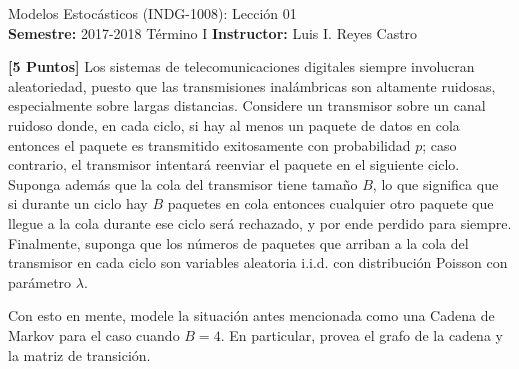 \documentclass[ a4paper, twoside, 11pt]{article}
\newcommand{\numero}{01}
\begin{document}
\allowdisplaybreaks

\begin{center}
\Large Modelos Estoc\'asticos (INDG-1008): Lecci\'on \numero \\[1ex]
\small \textbf{Semestre:} 2017-2018 T\'ermino I \qquad
\textbf{Instructor:} Luis I. Reyes Castro
\end{center}
\halfskip



\begin{problem}
\textbf{[5 Puntos]} Los sistemas de telecomunicaciones digitales siempre involucran aleatoriedad, puesto que las transmisiones inal\'ambricas son altamente ruidosas, especialmente sobre largas distancias. Considere un transmisor sobre un canal ruidoso donde, en cada ciclo, \linebreak si hay al menos un paquete de datos en cola entonces el paquete es transmitido exitosamente con probabilidad $p$; caso contrario, el transmisor intentar\'a reenviar el paquete en el siguiente ciclo. Suponga adem\'as que la cola del transmisor tiene tama\~no $B$, lo que significa que si durante un ciclo hay $B$ paquetes en cola entonces cualquier otro paquete que llegue a la cola durante ese ciclo ser\'a rechazado, y por ende perdido para siempre. Finalmente, suponga que los n\'umeros de paquetes que arriban a la cola del transmisor en cada ciclo son variables aleatoria i.i.d. con distribuci\'on Poisson con par\'ametro $\lambda$. 

Con esto en mente, modele la situaci\'on antes mencionada como una Cadena de Markov para el caso cuando $B = 4$. En particular, provea el grafo de la cadena y la matriz de transici\'on. 


\end{problem}
\end{document}
